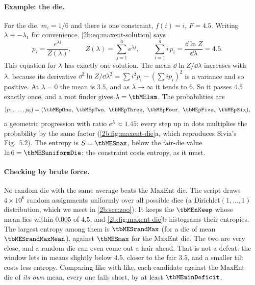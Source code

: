 \paragraph{Example: the die.} For the die, $m_i=1/6$ and there is one constraint, $f(i)=i$, $F=4.5$. Writing $\lambda\equiv-\lambda_1$ for convenience, \eqref{2b:eq:maxent-solution} says
\begin{equation}
  p_i=\frac{e^{\lambda i}}{Z(\lambda)},\qquad Z(\lambda)=\sum_{j=1}^6 e^{\lambda j},\qquad
  \sum_{i=1}^6 i\,p_i=\frac{\dd\ln Z}{\dd\lambda}=4.5 .
  \label{2b:eq:die-maxent}
\end{equation}
This equation for $\lambda$ has exactly one solution. The mean $\dd\ln Z/\dd\lambda$ increases with $\lambda$, because its derivative $\dd^2\ln Z/\dd\lambda^2=\sum i^2p_i-(\sum ip_i)^2$ is a variance and so positive. At $\lambda=0$ the mean is $3.5$, and as $\lambda\to\infty$ it tends to $6$. So it passes $4.5$ exactly once, and a root finder gives $\lambda=\tbMElam$. The probabilities are
\[
  (p_1,\dots,p_6)=(\tbMEpOne,\ \tbMEpTwo,\ \tbMEpThree,\ \tbMEpFour,\ \tbMEpFive,\ \tbMEpSix),
\]
a geometric progression with ratio $e^\lambda\approx1.45$: every step up in dots multiplies the probability by the same factor (\cref{2b:fig:maxent-die}a, which reproduces Sivia's Fig.~5.2). The entropy is $S=\tbMESmax$, below the fair-die value $\ln6=\tbMESuniformDie$: the constraint costs entropy, as it must.

\paragraph{Checking by brute force.} No random die with the same average beats the MaxEnt die. The script draws $4\times10^6$ random assignments uniformly over all possible dice (a Dirichlet$(1,\dots,1)$ distribution, which we meet in \cref{2b:sec:zoo}). It keeps the $\tbMEnKeep$ whose mean lies within $0.005$ of $4.5$, and \cref{2b:fig:maxent-die}b histograms their entropies. The largest entropy among them is $\tbMESrandMax$ (for a die of mean $\tbMESrandMaxMean$), against $\tbMESmax$ for the MaxEnt die. The two are very close, and a random die can even come out a hair ahead. That is not a defeat: the window lets in means slightly below $4.5$, closer to the fair $3.5$, and a smaller tilt costs less entropy. Comparing like with like, each candidate against the MaxEnt die of \emph{its own} mean, every one falls short, by at least $\tbMEminDeficit$.



